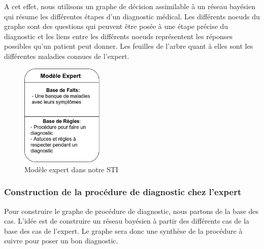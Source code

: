     A cet effet, nous utilisons un graphe de décision assimilable à un réseau bayésien qui résume les différentes étapes d'un diagnostic médical.
    Les différents noeuds du graphe sont des questions qui peuvent être posée à une étape précise du diagnostic et les liens entre les différents noeuds représentent les réponses possibles qu'un patient peut donner. Les feuilles de l'arbre quant à elles sont les différentes maladies connues de l'expert.
    
    \begin{figure}[H]
        \centering
        \includegraphics[width=0.35\textwidth]{figures/concept_expert.png}
        \captionsetup{justification=centering}
        \caption{Modèle expert dans notre STI}
        \label{fig:3}
    \end{figure}
    
    \subsubsection{Construction de la procédure de diagnostic chez l'expert}
    Pour construire le graphe de procédure de diagnostic, nous partons de la base des cas. L'idée est de construire un réseau bayésien à partir des différents cas de la base des cas de l'expert.
    Le graphe sera donc une synthèse de la procédure à suivre pour poser un bon diagnostic.
    
